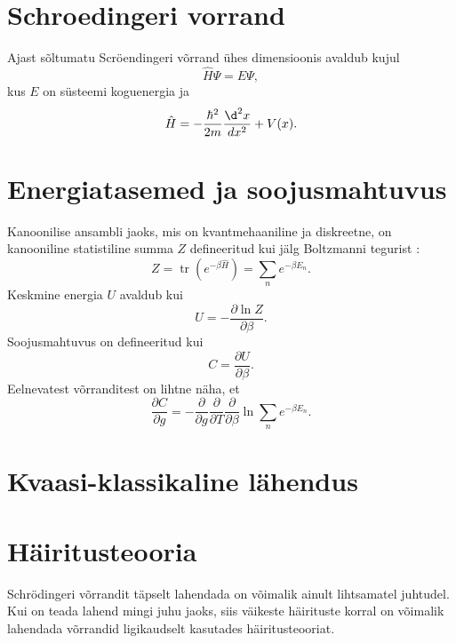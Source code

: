 \documentclass{trkut}%
\DeclareMathOperator{\tr}{tr}
\begin{document}
\section{Schroedingeri vorrand}

Ajast sõltumatu Scröendingeri võrrand ühes dimensioonis avaldub kujul \cite{griffiths05}
\begin{equation}
    \hat{H} \Psi = E \Psi, 
\end{equation}
kus \(E\) on süsteemi koguenergia ja 
\begin{equation}
    \hat{H}=-\frac{\hbar^2}{2m}\frac{\d^2x}{dx^2}+V(x).
\end{equation}

\section{Energiatasemed ja soojusmahtuvus}

Kanoonilise ansambli jaoks, mis on kvantmehaaniline ja diskreetne, on kanooniline statistiline summa \(Z\) defineeritud kui jälg Boltzmanni tegurist \cite{kardar07}:
\begin{equation}
    Z=\tr(e^{-\beta \hat{H}})=\sum_{n} e^{-\beta E_n}.
\end{equation}
Keskmine energia \(U\) avaldub kui \cite{kardar07}
\begin{equation}
    U=- \frac{\partial \ln Z}{\partial \beta}.
\end{equation}
Soojusmahtuvus on defineeritud kui 
\begin{equation}
    C=\frac{\partial U}{\partial \beta}.
\end{equation}
Eelnevatest võrranditest on lihtne näha, et
\begin{equation}
    \frac{\partial C}{\partial g}=- \frac{\partial}{\partial g}  \frac{\partial}{\partial T} \frac{\partial}{\partial \beta} \ln {\sum_{n} e^{-\beta E_n}}.
\end{equation}

\section{Kvaasi-klassikaline lähendus}

\section{Häiritusteooria}

Schrödingeri võrrandit täpselt lahendada on võimalik ainult lihtsamatel juhtudel. Kui on teada lahend mingi juhu jaoks, siis väikeste häirituste korral on võimalik lahendada võrrandid ligikaudselt kasutades häiritusteooriat. 
\end{document}
